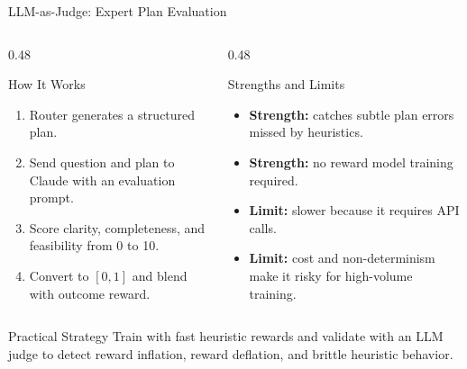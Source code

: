 \documentclass[aspectratio=169,11pt]{beamer}
\newcommand{\tightitems}{\setlength{\itemsep}{0.25em}\setlength{\parskip}{0pt}}
\begin{document}
\begin{frame}{LLM-as-Judge: Expert Plan Evaluation}
\begin{columns}[T,onlytextwidth]
  \begin{column}{0.48\textwidth}
    \begin{block}{How It Works}
    \begin{enumerate}\tightitems
      \item Router generates a structured plan.
      \item Send question and plan to Claude with an evaluation prompt.
      \item Score clarity, completeness, and feasibility from 0 to 10.
      \item Convert to $[0,1]$ and blend with outcome reward.
    \end{enumerate}
    \end{block}
  \end{column}
  \begin{column}{0.48\textwidth}
    \begin{block}{Strengths and Limits}
    \begin{itemize}\tightitems
      \item \textbf{Strength:} catches subtle plan errors missed by heuristics.
      \item \textbf{Strength:} no reward model training required.
      \item \textbf{Limit:} slower because it requires API calls.
      \item \textbf{Limit:} cost and non-determinism make it risky for high-volume training.
    \end{itemize}
    \end{block}
  \end{column}
\end{columns}
\vspace{0.7em}
\begin{block}{Practical Strategy}
Train with fast heuristic rewards and validate with an LLM judge to detect reward inflation, reward deflation, and brittle heuristic behavior.
\end{block}
\end{frame}
\end{document}
